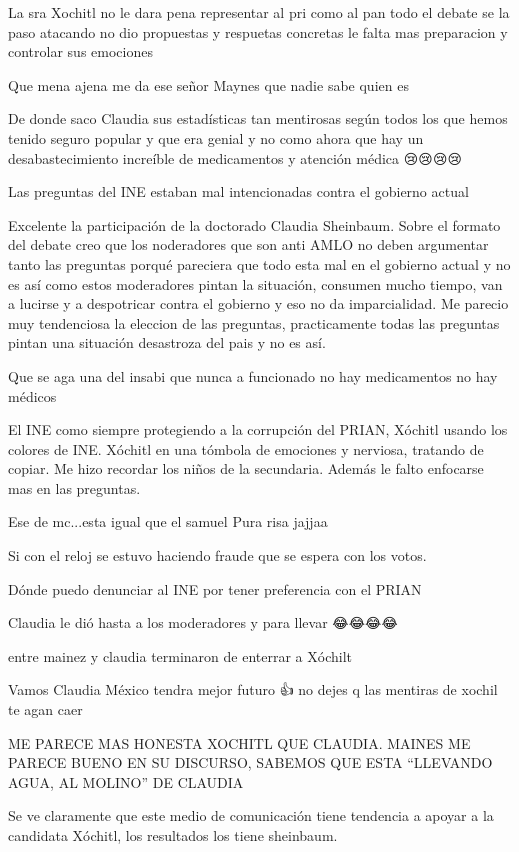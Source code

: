 La sra Xochitl no le dara pena representar al pri como al pan todo el debate se la paso atacando no dio propuestas y respuetas concretas le falta mas preparacion y controlar sus emociones

Que mena ajena me da ese señor Maynes que nadie sabe quien es

De donde saco Claudia sus estadísticas tan mentirosas según todos los que hemos tenido seguro popular y que era genial y no como ahora que hay un desabastecimiento increíble de medicamentos y atención médica 😢😢😢😢

Las preguntas del INE estaban mal intencionadas contra el gobierno actual

Excelente la participación de la doctorado Claudia Sheinbaum.
Sobre el formato del debate creo que los noderadores que son anti AMLO no deben argumentar tanto las preguntas porqué pareciera que todo esta mal en el gobierno actual y no es así como estos moderadores pintan la situación, consumen mucho tiempo, van a lucirse y a despotricar contra el gobierno y eso no da imparcialidad.
Me parecio muy tendenciosa la eleccion de las preguntas, practicamente todas las preguntas pintan una situación desastroza del pais y no es así.

Que se aga una del insabi que nunca a  funcionado no hay medicamentos no hay médicos

El INE como siempre protegiendo a la corrupción del  PRIAN, Xóchitl usando los colores de INE. Xóchitl en una tómbola de emociones y nerviosa,  tratando de copiar. Me hizo recordar los niños  de la secundaria. Además le falto enfocarse mas en las preguntas.

Ese de mc...esta igual que el samuel
Pura risa jajjaa

Si con el reloj se estuvo haciendo fraude que se espera con los votos.

Dónde puedo denunciar al INE por tener preferencia con el PRIAN

Claudia le dió hasta a los moderadores  y para llevar 😂😂😂😂

entre mainez y claudia terminaron de enterrar a Xóchilt

Vamos Claudia México tendra mejor futuro 👍 no dejes q las mentiras de xochil te agan caer

ME PARECE MAS HONESTA XOCHITL QUE CLAUDIA.  MAINES ME PARECE BUENO EN SU DISCURSO, SABEMOS QUE ESTA “LLEVANDO AGUA, AL MOLINO” DE CLAUDIA

Se ve claramente que este medio de comunicación tiene tendencia a apoyar a la candidata Xóchitl, los resultados los tiene sheinbaum.

